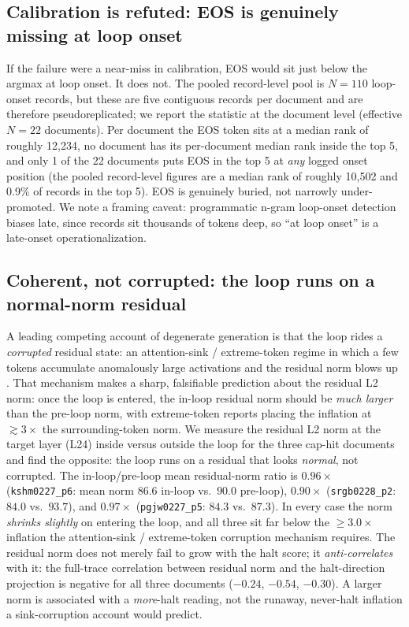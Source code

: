 \documentclass[11pt]{article}
\begin{document}
\subsection{Calibration is refuted: EOS is genuinely missing at loop onset}

If the failure were a near-miss in calibration, EOS would sit just below the argmax at
loop onset. It does not. The pooled record-level pool is $N=110$ loop-onset records,
but these are five contiguous records per document and are therefore pseudoreplicated;
we report the statistic at the document level (effective $N=22$ documents). Per document
the EOS token sits at a median rank of roughly 12{,}234, no document has its per-document
median rank inside the top 5, and only 1 of the 22 documents puts EOS in the top 5 at
\emph{any} logged onset position (the pooled record-level figures are a median rank of
roughly 10{,}502 and 0.9\% of records in the top 5). EOS is genuinely buried, not
narrowly under-promoted. We note a framing
caveat: programmatic n-gram loop-onset detection biases late, since records sit
thousands of tokens deep, so ``at loop onset'' is a late-onset operationalization.

\subsection{Coherent, not corrupted: the loop runs on a normal-norm residual}
\label{sec:normnull}

A leading competing account of degenerate generation is that the loop rides a
\emph{corrupted} residual state: an attention-sink / extreme-token regime in which a few
tokens accumulate anomalously large activations and the residual norm blows up
\citep{xiao2024streaming,repeatedtoken2025}. That mechanism makes a sharp, falsifiable
prediction about the residual L2 norm: once the loop is entered, the in-loop residual
norm should be \emph{much larger} than the pre-loop norm, with extreme-token reports
placing the inflation at $\gtrsim 3\times$ the surrounding-token norm. We measure the
residual L2 norm at the target layer (L24) inside versus outside the loop for the three
cap-hit documents and find the opposite: the loop runs on a residual that looks
\emph{normal}, not corrupted. The in-loop/pre-loop mean residual-norm ratio is
$0.96\times$ (\texttt{kshm0227\_p6}: mean norm $86.6$ in-loop vs.\ $90.0$ pre-loop),
$0.90\times$ (\texttt{srgb0228\_p2}: $84.0$ vs.\ $93.7$), and $0.97\times$
(\texttt{pgjw0227\_p5}: $84.3$ vs.\ $87.3$). In every case the norm \emph{shrinks
slightly} on entering the loop, and all three sit far below the $\geq 3.0\times$
inflation the attention-sink / extreme-token corruption mechanism requires. The
residual norm does not merely fail to grow with the halt score; it \emph{anti-correlates}
with it: the full-trace correlation between residual norm and the halt-direction
projection is negative for all three documents ($-0.24$, $-0.54$, $-0.30$). A larger
norm is associated with a \emph{more}-halt reading, not the runaway, never-halt
inflation a sink-corruption account would predict.
\end{document}
